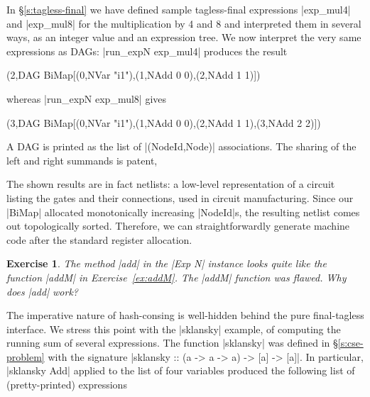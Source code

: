 \documentclass[submission,copyright,creativecommons]{eptcs}
\newtheorem{Exercise}{Exercise} \newcommand\aside[1]{}
\begin{document}
In \S\ref{s:tagless-final} we have defined sample tagless-final
expressions |exp_mul4| and |exp_mul8| for the multiplication by 4 and 8
and interpreted them in several ways, as an integer value and an
expression tree. We now interpret the very same expressions as DAGs:
|run_expN exp_mul4| produces the result
\begin{code}
(2,DAG BiMap[(0,NVar "i1"),(1,NAdd 0 0),(2,NAdd 1 1)])
\end{code}
whereas |run_expN exp_mul8| gives
\begin{code}
(3,DAG BiMap[(0,NVar "i1"),(1,NAdd 0 0),(2,NAdd 1 1),(3,NAdd 2 2)])
\end{code}
A DAG is printed as the list of |(NodeId,Node)| associations. The
sharing of the left and right summands is patent,

The shown results are in fact netlists: a low-level representation of
a circuit listing the gates and their connections, used in circuit
manufacturing. Since our |BiMap| allocated monotonically increasing
|NodeId|s, the resulting netlist comes out topologically sorted.
Therefore, we can straightforwardly generate machine code after the
standard register allocation.

\begin{Exercise}
The method |add| in the |Exp N| instance looks quite like
the function |addM| in Exercise~\ref{ex:addM}. The |addM| function
was flawed. Why does |add| work?
\end{Exercise}

The imperative nature of hash-consing is well-hidden behind the pure
final-tagless interface. We stress this point with the |sklansky|
example, of computing the running sum of several expressions. 
The function |sklansky| was defined in \S\ref{s:cse-problem} with the signature
|sklansky :: (a -> a -> a) -> [a] -> [a]|. In particular,
|sklansky Add| applied to the list of four variables produced the
following list of (pretty-printed) expressions
\begin{code}
["v1","(v1+v2)","((v1+v2)+v3)","((v1+v2)+(v3+v4))"]
\end{code}
\end{document}

